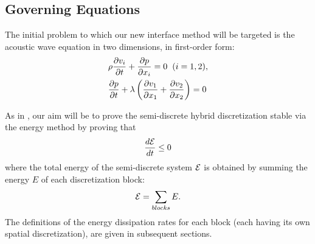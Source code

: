 

\subsection{Governing Equations}

The initial problem to which our new interface method will be targeted is
the acoustic wave equation in two dimensions, in first-order form:
\begin{align}
	&\rho \frac{\partial v_{i}}{\partial t} + \frac{\partial p}{\partial x_{i}} = 0 \hspace{2mm} (i = 1, 2), \label{eq:wave1} \\
	&\frac{\partial p}{\partial t} + \lambda \left(\frac{\partial v_{1}}{\partial x_{1}} + \frac{\partial v_{2}}{\partial x_{2}} \right) = 0 \label{eq:wave2}
\end{align}

As in \cite{kozdon2016stable}, our aim will be to prove the semi-discrete hybrid discretization
stable via the energy method by proving that
\begin{align}
\frac{d\mathcal{E}}{dt} \leq 0
\end{align}
where the total energy of the semi-discrete system $\mathcal{E}$ is obtained by summing the
energy $E$ of each discretization block:
\begin{align}
\mathcal{E} = \sum_{blocks} E.
\end{align}
The definitions of the energy dissipation rates for each
block (each having its own spatial discretization), are given in subsequent
sections.

